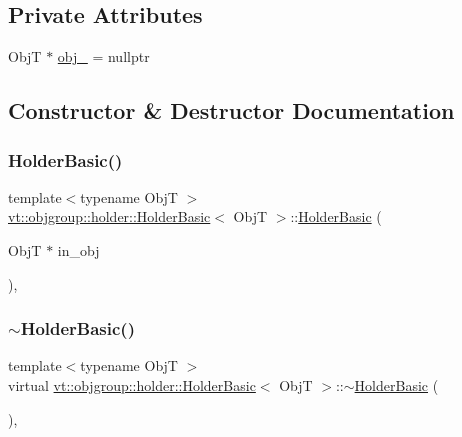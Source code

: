 \subsection*{Private Attributes}
\begin{DoxyCompactItemize}
\item 
ObjT $\ast$ \hyperlink{structvt_1_1objgroup_1_1holder_1_1_holder_basic_a2313dfbdc994c52b649ee2fc666f1219}{obj\+\_\+} = nullptr
\end{DoxyCompactItemize}


\subsection{Constructor \& Destructor Documentation}
\mbox{\label{structvt_1_1objgroup_1_1holder_1_1_holder_basic_a0e74a9b5eb928c8d9cdaf81dd0994d7b}} 
\subsubsection{\texorpdfstring{Holder\+Basic()}{HolderBasic()}}
{\footnotesize\ttfamily template$<$typename ObjT $>$ \\
\hyperlink{structvt_1_1objgroup_1_1holder_1_1_holder_basic}{vt\+::objgroup\+::holder\+::\+Holder\+Basic}$<$ ObjT $>$\+::\hyperlink{structvt_1_1objgroup_1_1holder_1_1_holder_basic}{Holder\+Basic} (\begin{DoxyParamCaption}\item[{ObjT $\ast$}]{in\+\_\+obj }\end{DoxyParamCaption})\hspace{0.3cm}{\ttfamily [inline]}, {\ttfamily [explicit]}}

\mbox{\label{structvt_1_1objgroup_1_1holder_1_1_holder_basic_a7446aae8de5ccb8e9cceee2143ca29ea}} 
\subsubsection{\texorpdfstring{$\sim$\+Holder\+Basic()}{~HolderBasic()}}
{\footnotesize\ttfamily template$<$typename ObjT $>$ \\
virtual \hyperlink{structvt_1_1objgroup_1_1holder_1_1_holder_basic}{vt\+::objgroup\+::holder\+::\+Holder\+Basic}$<$ ObjT $>$\+::$\sim$\hyperlink{structvt_1_1objgroup_1_1holder_1_1_holder_basic}{Holder\+Basic} (\begin{DoxyParamCaption}{ }\end{DoxyParamCaption})\hspace{0.3cm}{\ttfamily [virtual]}, {\ttfamily [default]}}



